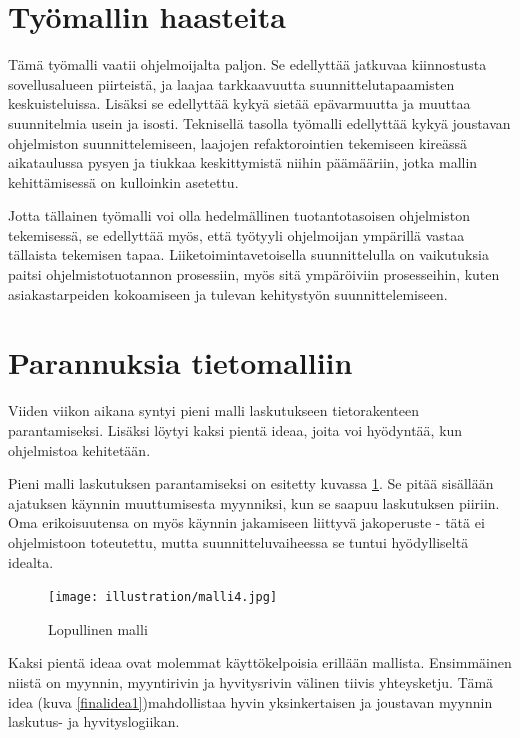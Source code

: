 \hypertarget{tyuxf6mallin-haasteita}{%
\section{Työmallin haasteita}\label{tyuxf6mallin-haasteita}}

Tämä työmalli vaatii ohjelmoijalta paljon. Se edellyttää jatkuvaa
kiinnostusta sovellusalueen piirteistä, ja laajaa tarkkaavuutta
suunnittelutapaamisten keskuisteluissa. Lisäksi se edellyttää kykyä
sietää epävarmuutta ja muuttaa suunnitelmia usein ja isosti. Teknisellä
tasolla työmalli edellyttää kykyä joustavan ohjelmiston
suunnittelemiseen, laajojen refaktorointien tekemiseen kireässä
aikataulussa pysyen ja tiukkaa keskittymistä niihin päämääriin, jotka
mallin kehittämisessä on kulloinkin asetettu.

Jotta tällainen työmalli voi olla hedelmällinen tuotantotasoisen
ohjelmiston tekemisessä, se edellyttää myös, että työtyyli ohjelmoijan
ympärillä vastaa tällaista tekemisen tapaa. Liiketoimintavetoisella
suunnittelulla on vaikutuksia paitsi ohjelmistotuotannon prosessiin,
myös sitä ympäröiviin prosesseihin, kuten asiakastarpeiden kokoamiseen
ja tulevan kehitystyön suunnittelemiseen.

\hypertarget{parannuksia-tietomalliin}{%
\section{Parannuksia tietomalliin}\label{parannuksia-tietomalliin}}

Viiden viikon aikana syntyi pieni malli laskutukseen tietorakenteen
parantamiseksi. Lisäksi löytyi kaksi pientä ideaa, joita voi hyödyntää,
kun ohjelmistoa kehitetään.

Pieni malli laskutuksen parantamiseksi on esitetty kuvassa
\ref{finalmodel1-again}. Se pitää sisällään ajatuksen käynnin
muuttumisesta myynniksi, kun se saapuu laskutuksen piiriin. Oma
erikoisuutensa on myös käynnin jakamiseen liittyvä jakoperuste - tätä ei
ohjelmistoon toteutettu, mutta suunnitteluvaiheessa se tuntui
hyödylliseltä idealta.

\begin{figure}
\centering
\texttt{[image: illustration/malli4.jpg]}
\caption{\label{finalmodel1-again}Lopullinen malli}
\end{figure}

Kaksi pientä ideaa ovat molemmat käyttökelpoisia erillään mallista.
Ensimmäinen niistä on myynnin, myyntirivin ja hyvitysrivin välinen
tiivis yhteysketju. Tämä idea (kuva \ref{finalidea1})mahdollistaa hyvin
yksinkertaisen ja joustavan myynnin laskutus- ja hyvityslogiikan.

